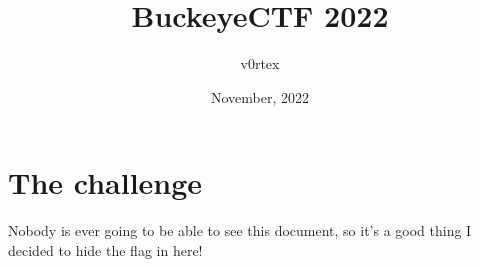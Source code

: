 \documentclass{article}
\title{BuckeyeCTF 2022}
\author{v0rtex}
\date{November, 2022}
\begin{document}
\maketitle

\section{The challenge}
Nobody is ever going to be able to see this document, so it's a good thing I decided to hide the flag in here! 

\end{document}
